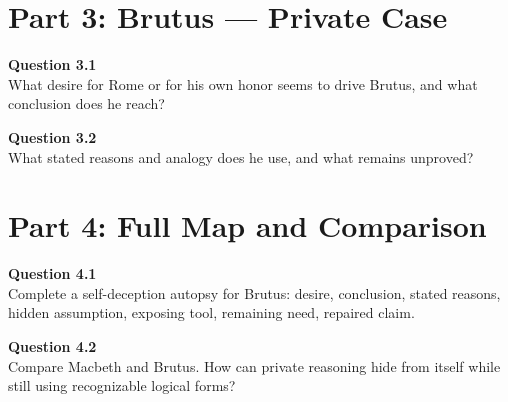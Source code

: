 \documentclass[12pt]{article}
\begin{document}
\section*{Part 3: Brutus --- Private Case}

\textbf{Question 3.1}\\[-0.15em]
What desire for Rome or for his own honor seems to drive Brutus, and what conclusion does he reach?


\textbf{Question 3.2}\\[-0.15em]
What stated reasons and analogy does he use, and what remains unproved?


\newpage

\section*{Part 4: Full Map and Comparison}

\textbf{Question 4.1}\\[-0.15em]
Complete a self-deception autopsy for Brutus: desire, conclusion, stated reasons, hidden assumption, exposing tool, remaining need, repaired claim.


\textbf{Question 4.2}\\[-0.15em]
Compare Macbeth and Brutus. How can private reasoning hide from itself while still using recognizable logical forms?

\end{document}
